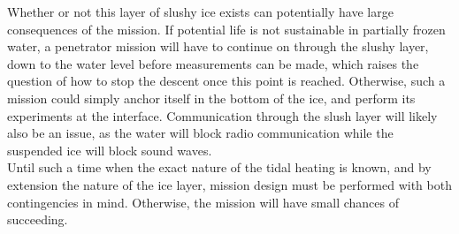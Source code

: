 \noindent
Whether or not this layer of slushy ice exists can potentially have large consequences of the mission. If potential life is not sustainable in partially frozen water, a penetrator mission will have to continue on through the slushy layer, down to the water level before measurements can be made, which raises the question of how to stop the descent once this point is reached. Otherwise, such a mission could simply anchor itself in the bottom of the ice, and perform its experiments at the interface. Communication through the slush layer will likely also be an issue, as the water will block radio communication while the suspended ice will block sound waves.\\

\noindent
Until such a time when the exact nature of the tidal heating is known, and by extension the nature of the ice layer, mission design must be performed with both contingencies in mind. Otherwise, the mission will have small chances of succeeding.
